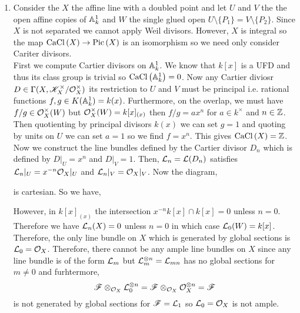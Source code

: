 \documentclass[12pt]{article}
\begin{document}
\begin{enumerate}
\item Consider the $X$ the affine line with a doubled point and let $U$ and $V$ the the open affine copies of $\mathbb{A}^1_k$ and $W$ the single glued open $U \setminus \{ P_1 \} = V \setminus \{ P_2 \}$. Since $X$ is not separated we cannot apply Weil divisors. However, $X$ is integral so the map $\mathrm{CaCl}\left( X \right) \to \mathrm{Pic} \left( X \right)$ is an isomorphism so we need only consider Cariter divisors. 
\bigskip\\
First we compute Cartier divisors on $\mathbb{A}^1_k$. We know that $k[x]$ is a UFD and thus its class group is trivial so $\mathrm{CaCl}\left( \mathbb{A}^1_k \right) = 0$. Now any Cartier diviosr $D \in \Gamma(X, \mathscr{K}^\times_X / \mathcal{O}_{X}^\times)$ its restriction to $U$ and $V$ must be principal i.e. rational functions $f, g \in K(\mathbb{A}^1_k) = k(x)$. Furthermore, on the overlap, we must have $f/g \in \mathcal{O}_{X}^\times(W)$ but $\mathcal{O}_{X}^\times(W) = k[x]_{(x)}$ then $f / g = a x^n$ for $a \in k^\times$ and $n \in \mathbb{Z}$. Then quotienting by principal divisors $k(x)$ we can set $g = 1$ and quoting by units on $U$ we can set $a = 1$ so we find $f = x^n$. This gives $\mathrm{CaCl}\left( X \right) = \mathbb{Z}$. 
\bigskip\\
Now we construct the line bundles defined by the Cartier divisor $D_n$ which is defined by $D|_U = x^n$ and $D|_V = 1$. Then, $\mathcal{L}_n = \mathcal{L}(D_n)$ satisfies $\mathcal{L}_n|_U = x^{-n} \mathcal{O}_{X}|_U$ and $\mathcal{L}_n|_V = \mathcal{O}_{X}|_V$.     
Now the diagram,
\begin{center}
\end{center}
is cartesian. So we have,
\begin{center}
\end{center}
However, in $k[x]_{(x)}$ the intersection $x^{-n} k[x] \cap k[x] = 0$ unless $n = 0$. Therefore we have $\mathcal{L}_n(X) = 0$ unless $n = 0$ in which case $\mathcal{L}_0(W) = k[x]$. Therefore, the only line bundle on $X$ which is generated by global sections is $\mathcal{L}_0 = \mathcal{O}_{X}$. Therefore, there cannot be any ample line bundles on $X$ since any line bundle is of the form $\mathcal{L}_m$ but $\mathcal{L}_m^{\otimes n} = \mathcal{L}_{mn}$ has no global sections for $m \neq 0$ and furhtermore, 
\[ \mathscr{F} \otimes_{\mathcal{O}_{X}} \mathcal{L}_0^{\otimes n} = \mathscr{F} \otimes_{\mathcal{O}_{X}} \mathcal{O}_{X}^{\otimes n} = \mathscr{F} \]
is not generated by global sections for $\mathscr{F} = \mathcal{L}_1$ so $\mathcal{L}_0 = \mathcal{O}_{X}$ is not ample. 
\end{enumerate}
\end{document}
